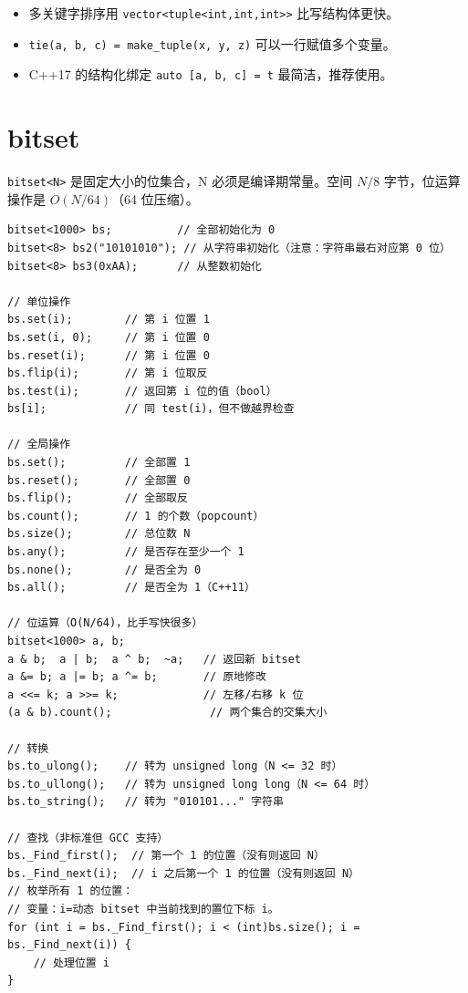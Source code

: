\documentclass[UTF8,openany,oneside,zihao=-4]{ctexbook}
\begin{document}
\begin{tip}
\begin{itemize}
  \item 多关键字排序用 \lstinline|vector<tuple<int,int,int>>| 比写结构体更快。
  \item \lstinline|tie(a, b, c) = make_tuple(x, y, z)| 可以一行赋值多个变量。
  \item C++17 的结构化绑定 \lstinline|auto [a, b, c] = t| 最简洁，推荐使用。
\end{itemize}
\end{tip}

\section{bitset}

\begin{note}
\lstinline|bitset<N>| 是固定大小的位集合，N 必须是编译期常量。空间 $N/8$ 字节，位运算操作是 $O(N/64)$（64 位压缩）。
\end{note}

\begin{lstlisting}
bitset<1000> bs;          // 全部初始化为 0
bitset<8> bs2("10101010"); // 从字符串初始化（注意：字符串最右对应第 0 位）
bitset<8> bs3(0xAA);      // 从整数初始化

// 单位操作
bs.set(i);        // 第 i 位置 1
bs.set(i, 0);     // 第 i 位置 0
bs.reset(i);      // 第 i 位置 0
bs.flip(i);       // 第 i 位取反
bs.test(i);       // 返回第 i 位的值（bool）
bs[i];            // 同 test(i)，但不做越界检查

// 全局操作
bs.set();         // 全部置 1
bs.reset();       // 全部置 0
bs.flip();        // 全部取反
bs.count();       // 1 的个数（popcount）
bs.size();        // 总位数 N
bs.any();         // 是否存在至少一个 1
bs.none();        // 是否全为 0
bs.all();         // 是否全为 1（C++11）

// 位运算（O(N/64)，比手写快很多）
bitset<1000> a, b;
a & b;  a | b;  a ^ b;  ~a;   // 返回新 bitset
a &= b; a |= b; a ^= b;       // 原地修改
a <<= k; a >>= k;             // 左移/右移 k 位
(a & b).count();               // 两个集合的交集大小

// 转换
bs.to_ulong();    // 转为 unsigned long（N <= 32 时）
bs.to_ullong();   // 转为 unsigned long long（N <= 64 时）
bs.to_string();   // 转为 "010101..." 字符串

// 查找（非标准但 GCC 支持）
bs._Find_first();  // 第一个 1 的位置（没有则返回 N）
bs._Find_next(i);  // i 之后第一个 1 的位置（没有则返回 N）
// 枚举所有 1 的位置：
// 变量：i=动态 bitset 中当前找到的置位下标 i。
for (int i = bs._Find_first(); i < (int)bs.size(); i = bs._Find_next(i)) {
    // 处理位置 i
}
\end{lstlisting}
\end{document}
